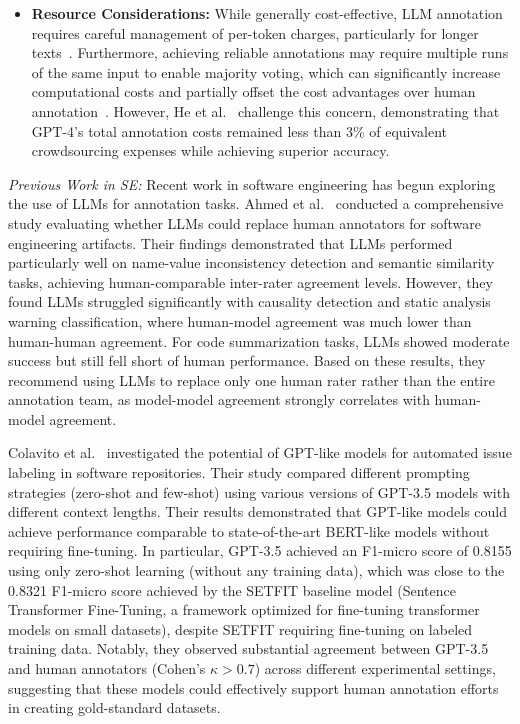 \documentclass[11pt]{article}
\begin{document}
\begin{itemize}
    \item \textbf{Resource Considerations:} While generally cost-effective, LLM annotation requires careful management of per-token charges, particularly for longer texts~\cite{DBLP:conf/emnlp/WangLXZZ21}. Furthermore, achieving reliable annotations may require multiple runs of the same input to enable majority voting, which can significantly increase computational costs and partially offset the cost advantages over human annotation~\cite{DBLP:journals/corr/abs-2304-11085}. However, He et al.~\cite{DBLP:conf/chi/HeHDRH24} challenge this concern, demonstrating that GPT-4's total annotation costs remained less than 3\% of equivalent crowdsourcing expenses while achieving superior accuracy.
\end{itemize}

\emph{Previous Work in SE:} Recent work in software engineering has begun exploring the use of LLMs for annotation tasks. 
Ahmed et al.~\cite{DBLP:journals/corr/abs-2408-05534} conducted a comprehensive study evaluating whether LLMs could replace human annotators for software engineering artifacts.
Their findings demonstrated that LLMs performed particularly well on name-value inconsistency detection and semantic similarity tasks, achieving human-comparable inter-rater agreement levels. 
However, they found LLMs struggled significantly with causality detection and static analysis warning classification, where human-model agreement was much lower than human-human agreement. 
For code summarization tasks, LLMs showed moderate success but still fell short of human performance. 
Based on these results, they recommend using LLMs to replace only one human rater rather than the entire annotation team, as model-model agreement strongly correlates with human-model agreement.

Colavito et al.~\cite{DBLP:conf/msr/ColavitoLNQ24} investigated the potential of GPT-like models for automated issue labeling in software repositories. 
Their study compared different prompting strategies (zero-shot and few-shot) using various versions of GPT-3.5 models with different context lengths. 
Their results demonstrated that GPT-like models could achieve performance comparable to state-of-the-art BERT-like models without requiring fine-tuning. 
In particular, GPT-3.5 achieved an F1-micro score of 0.8155 using only zero-shot learning (without any training data), which was close to the 0.8321 F1-micro score achieved by the SETFIT baseline model (Sentence Transformer Fine-Tuning, a framework optimized for fine-tuning transformer models on small datasets), despite SETFIT requiring fine-tuning on labeled training data.
Notably, they observed substantial agreement between GPT-3.5 and human annotators (Cohen's $\kappa > 0.7$) across different experimental settings, suggesting that these models could effectively support human annotation efforts in creating gold-standard datasets.
\end{document}
